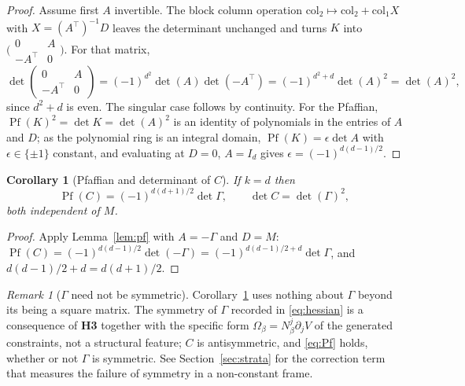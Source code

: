 \documentclass[12pt]{article}
\theoremstyle{plain}
\newtheorem{corollary}[theorem]{Corollary}
\theoremstyle{definition}
\theoremstyle{remark}
\newtheorem{remark}[theorem]{Remark}
\DeclareMathOperator{\Pf}{Pf}
\newcommand{\pd}[1]{\partial_{#1}}
\newcommand{\Om}{\Omega}
\begin{document}
	\begin{proof}
		Assume first $A$ invertible. The block column operation
		$\mathrm{col}_{2}\mapsto\mathrm{col}_{2}+\mathrm{col}_{1}X$ with
		$X=(A^{\top})^{-1}D$ leaves the determinant unchanged and turns $K$ into
		$\bigl(\begin{smallmatrix}0&A\\-A^{\top}&0\end{smallmatrix}\bigr)$. For that
		matrix,
		\[
		\det\begin{pmatrix}0&A\\-A^{\top}&0\end{pmatrix}
		=(-1)^{d^{2}}\det(A)\det(-A^{\top})
		=(-1)^{d^{2}+d}\det(A)^{2}
		=\det(A)^{2},
		\]
		since $d^{2}+d$ is even. The singular case follows by continuity. For the
		Pfaffian, $\Pf(K)^{2}=\det K=\det(A)^{2}$ is an identity of polynomials in the
		entries of $A$ and $D$; as the polynomial ring is an integral domain,
		$\Pf(K)=\epsilon\det A$ with $\epsilon\in\{\pm1\}$ constant, and evaluating at
		$D=0$, $A=I_{d}$ gives $\epsilon=(-1)^{d(d-1)/2}$.
	\end{proof}
	
	\begin{corollary}[Pfaffian and determinant of $C$]
		\label{cor:pfC}
		If $k=d$ then
		\begin{equation}
			\Pf(C)=(-1)^{d(d+1)/2}\det\Gamma,
			\qquad
			\det C=\det(\Gamma)^{2},
			\label{eq:Pf}
		\end{equation}
		both independent of $M$.
	\end{corollary}
	
	\begin{proof}
		Apply Lemma~\ref{lem:pf} with $A=-\Gamma$ and $D=M$:
		$\Pf(C)=(-1)^{d(d-1)/2}\det(-\Gamma)=(-1)^{d(d-1)/2+d}\det\Gamma$, and
		$d(d-1)/2+d=d(d+1)/2$.
	\end{proof}
	
	\begin{remark}[$\Gamma$ need not be symmetric]
		\label{rem:nosym}
		Corollary~\ref{cor:pfC} uses nothing about $\Gamma$ beyond its being a square
		matrix. The symmetry of $\Gamma$ recorded in \eqref{eq:hessian} is a consequence
		of \textbf{H3} together with the specific form $\Om_{\beta}=N_{\beta}^{j}\pd{j}V$
		of the generated constraints, not a structural feature; $C$ is antisymmetric,
		and \eqref{eq:Pf} holds, whether or not $\Gamma$ is symmetric. See
		Section~\ref{sec:strata} for the correction term that measures the failure of
		symmetry in a non-constant frame.
	\end{remark}
	
\end{document}
